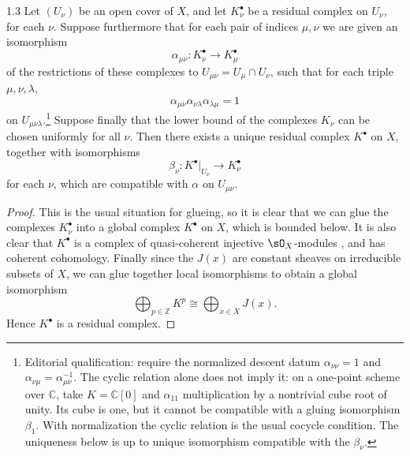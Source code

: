 \begin{booklemma}{1.3}\label{lem:6.1.3}
Let $(U_\nu)$ be an open cover of $X$, and let $K_\nu^\bullet$ be a residual complex on $U_\nu$, for each $\nu$. Suppose furthermore that for each pair of indices $\mu,\nu$ we are given an isomorphism
\[
\alpha_{\mu\nu}\colon K_{\nu}^{\bullet}\longrightarrow K_{\mu}^{\bullet}
\]
of the restrictions of these complexes to $U_{\mu\nu}=U_{\mu}\cap U_{\nu}$, such that for each triple $\mu,\nu,\lambda$,
\[
\alpha_{\mu\nu}\alpha_{\nu\lambda}\alpha_{\lambda\mu}=1
\]
on $U_{\mu\nu\lambda}$.\footnote{Editorial qualification: require the normalized descent datum $\alpha_{\nu\nu}=1$ and $\alpha_{\nu\mu}=\alpha_{\mu\nu}^{-1}$. The cyclic relation alone does not imply it: on a one-point scheme over $\mathbb C$, take $K=\mathbb C[0]$ and $\alpha_{11}$ multiplication by a nontrivial cube root of unity. Its cube is one, but it cannot be compatible with a gluing isomorphism $\beta_1$. With normalization the cyclic relation is the usual cocycle condition. The uniqueness below is up to unique isomorphism compatible with the $\beta_\nu$.} Suppose finally that the lower bound of the complexes $K_{\nu}$ can be chosen uniformly for all $\nu$. Then there exists a unique residual complex $K^{\bullet}$ on $X$, together with isomorphisms
\[
\beta_{\nu}\colon K^{\bullet}|_{U_{\nu}}\longrightarrow K_{\nu}^{\bullet}
\]
for each $\nu$, which are compatible with $\alpha$ on $U_{\mu\nu}$.
\end{booklemma}

\begin{proof}
This is the usual situation for glueing, so it is clear that we can glue the complexes $K_{\nu}^{\bullet}$ into a global complex $K^{\bullet}$ on $X$, which is bounded below. It is also clear that $K^{\bullet}$ is a complex of quasi-coherent injective $\sO_X$-modules , and has coherent cohomology. Finally since the $J(x)$ are constant sheaves on irreducible subsets of $X$, we can glue together local isomorphisms to obtain a global isomorphism
\[
\bigoplus_{p\in\mathbb{Z}} K^{p} \cong \bigoplus_{x\in X} J(x).
\]
Hence $K^\bullet$ is a residual complex.
\end{proof}

